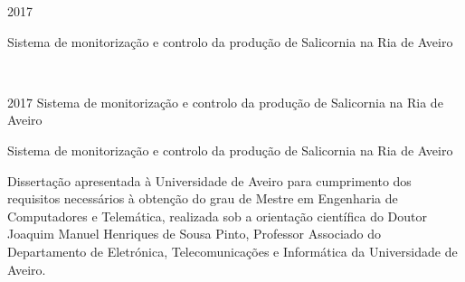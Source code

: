 \documentclass[11pt,twoside,a4paper]{report}
\def\ThesisYear{2017}
\newcommand{\namethesispt}{Sistema de monitorização e controlo da produção de Salicornia na Ria de Aveiro}
\newcommand{\namethesisen}{}
\begin{document}
%
%

\TitlePage
         {\ThesisYear}
        {\namethesispt
        \newline \newline
       	\namethesisen
    	}
\EndTitlePage
\titlepage\ \endtitlepage %

\TitlePage
  \HEADER{\BAR\FIG{\begin{minipage}{50mm} %
          \end{minipage}}}
         {\ThesisYear}
{\namethesispt
\newline \newline
\namethesisen}
\EndTitlePage
\titlepage\ \endtitlepage %


%
%

\TitlePage
  \HEADERSEM{}{\ThesisYear}
  {\namethesispt
  	\newline \newline
  	\namethesisen
  }
  \vspace*{15mm}
  \TEXT{}
       {Dissertação apresentada à Universidade de Aveiro para cumprimento dos requisitos necessários à obtenção do grau de Mestre em Engenharia de Computadores e Telemática, realizada sob a orientação científica do Doutor Joaquim Manuel Henriques de Sousa Pinto, Professor Associado do Departamento de Eletrónica, Telecomunicações e Informática da Universidade de Aveiro. }
\EndTitlePage
\titlepage\ \endtitlepage %
\end{document}
